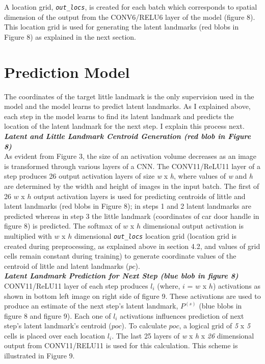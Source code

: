 \documentclass [11pt,letterpaper ,openany ]{report}
\begin{document}
    A location grid, \textit{\texttt{out\_locs}},  is created for each batch which corresponds to spatial dimension of the output from the CONV6/RELU6 layer of the model (figure 8). This location grid is used for generating the latent landmarks (red blobs in Figure 8) as explained in the next section.

    \section{Prediction Model}
    The coordinates of the target little landmark is the only supervision used in the model and the model learns to predict latent landmarks. As I explained above, each step in the model learns to find its latent landmark and predicts the location of the latent landmark for the next step. I explain this process next.\\

    \noindent
    \textbf{\textit{Latent and Little Landmark Centroid Generation (red blob in Figure 8)}}\\
    As evident from Figure 3, the size of an activation volume decreases as an image is transformed through various layers of a CNN. The CONV11/ReLU11 layer of a step produces 26 output activation layers of size \textit {w} x \textit {h}, where values of \textit {w} and \textit {h} are determined by the width and height of images in the input batch. The first of 26 \(w\) x \(h\) output activation layers is used for predicting centroids of little and latent landmarks (red blobs in Figure 8); in steps 1 and 2 latent landmarks are predicted whereas in step 3 the little landmark (coordinates of car door handle in figure 8) is predicted. The softmax of \(w\) x \(h\) dimensional output activation is multiplied with \(w\) x \(h\) dimensional \textit{\texttt{out\_locs}} location grid (location grid is created during preprocessing, as explained above in section 4.2, and values of grid cells remain constant during training) to generate coordinate values of the centroid of little and latent landmarks (\(pc\)).\\

    \noindent
    \textbf{\textit{Latent Landmark Prediction for Next Step (blue blob in figure 8)}}\\
    CONV11/ReLU11 layer of each step produces \(l_i\) (where, \(i\) = \(w\) x \(h\)) activations as shown in bottom left image on right side of figure 9. These activations are used to produce an estimate of the next step's latent landmark, \(P^{(s)}\) (blue blobs in figure 8 and figure 9). Each one of \(l_i\) activations influences prediction of next step's latent landmark's centroid (\(poc\)). To calculate \(poc\), a logical grid of \textit {5} x \textit {5} cells is placed over each location \(l_i\). The last 25 layers of \textit {w} x \textit {h} x \textit {26} dimensional output from CONV11/RELU11 is used for this calculation. This scheme is illustrated in Figure 9.
\end{document}
